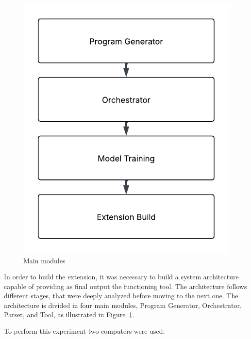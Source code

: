 \begin{figure}[htbp]
  \centering
  \includegraphics[scale=0.7]{figures/main_modules.pdf}
  \caption{Main modules}
  \label{fig:main_modules}
\end{figure}




In order to build the extension, it was necessary to build a system architecture capable of providing as final output the functioning tool. The architecture follows different stages, that were deeply analyzed before moving to the next one.
The architecture is divided in four main modules, Program Generator, Orchestrator, Parser, and Tool, as illustrated in Figure~\ref{fig:main_modules}.




To perform this experiment two computers were used:

